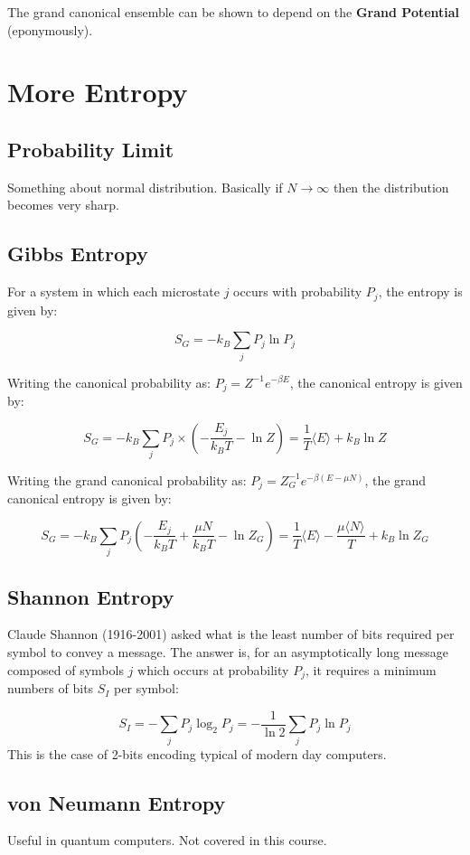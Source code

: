 \documentclass[12pt]{article}
\begin{document}
The grand canonical ensemble can be shown to depend on the \textbf{Grand Potential} (eponymously).

\section{More Entropy}

\subsection{Probability Limit}
Something about normal distribution. Basically if $N\to \infty$ then the distribution becomes very sharp.

\subsection{Gibbs Entropy}

For a system in which each microstate $j$ occurs with probability $P_j$, the entropy is given by:

\[ \boxed{S_G = -k_B\sum_jP_j \ln{P_j}}\]

Writing the canonical probability as: $P_j = Z^{-1}e^{-\beta E}$, the canonical entropy is given by:

\[\boxed{S_G = -k_B\sum_jP_j\times \left(-\frac{E_j}{k_BT} - \ln Z\right) = \frac{1}{T}\langle E \rangle + k_B \ln Z}\]

Writing the grand canonical probability as: $P_j = Z_G^{-1}e^{-\beta(E - \mu N)}$, the grand canonical entropy is given by:

\[\boxed{S_G = -k_B\sum_j P_j \left( -\frac{E_j}{k_BT} + \frac{\mu N}{k_B T} - \ln Z_G\right) = \frac1T\langle E \rangle - \frac{\mu \langle N \rangle}{T} + k_B \ln Z_G}\]

\subsection{Shannon Entropy}

Claude Shannon (1916-2001) asked what is the least number of bits required per symbol to convey a message. The answer is, for an asymptotically long message composed of symbols $j$ which occurs at probability $P_j$, it requires a minimum numbers of bits $S_I$ per symbol:

\[\boxed{S_I = -\sum_j P_j \log_2 P_j= -\frac{1}{\ln 2}\sum_j P_j \ln P_j}\]
This is the case of 2-bits encoding typical of modern day computers.

\subsection{von Neumann Entropy}
Useful in quantum computers. Not covered in this course.
\end{document}

